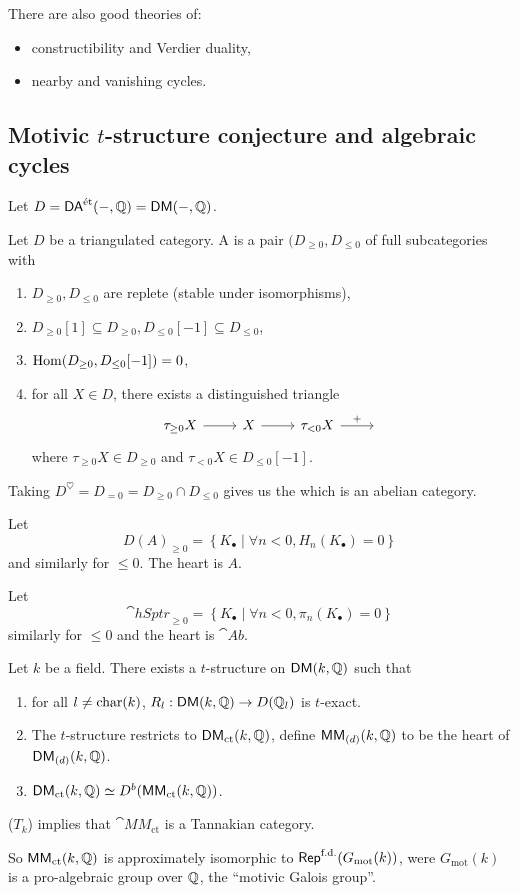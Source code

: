 There are also good theories of:
\begin{itemize}
\item constructibility and Verdier duality,
\item nearby and vanishing cycles.
\end{itemize}

\subsection{Motivic \texorpdfstring{$t$}{t}-structure conjecture and algebraic cycles}
Let $D = \mathsf{DA}^\text{\'et}(-,\mathbb Q) = \mathsf{DM}(-,\mathbb Q)$.
\begin{definition}
Let $D$ be a triangulated category. A  is a pair $(D_{\ge 0}, D_{\le
0}$ of full subcategories with
\begin{enumerate}[1)]
\item $D_{\ge 0}, D_{\le 0}$  are replete (stable under isomorphisms),
\item $D_{\ge 0}[1]\subseteq D_{\ge 0}, D_{\le 0}[-1]\subseteq D_{\le 0}$,
\item $\operatorname{Hom}(D_{\ge 0}, D_{\le 0}[-1]) = 0$,
\item for all $X\in D$, there exists a distinguished triangle
\[
\begin{tikzcd}
\tau_{\ge 0}X \ar[r] & X \ar[r] & \tau_{<0}X \ar[r,"+"] & {}
\end{tikzcd}
\]
where $\tau_{\ge 0}X\in D_{\ge 0}$ and $\tau_{<0}X\in D_{\le 0}[-1]$.
\end{enumerate}
Taking $D^\heartsuit=D_{=0} = D_{\ge 0}\cap D_{\le 0}$ gives us the  which is an
abelian category.
\end{definition}
\begin{example}
Let
\[
D(A)_{\ge 0} = \left\{ K_\bullet \middle| \forall n<0, H_n(K_\bullet)=0 \right\}
\]
and similarly for $\le 0$. The heart is $A$.
\end{example}
\begin{example}
Let
\[
\cat{hSptr}_{\ge 0} = \left\{ K_\bullet \middle| \forall n<0, \pi_n(K_\bullet)=0 \right\}
\]
similarly for $\le 0$ and the heart is $\cat{Ab}$.
\end{example}
\begin{conjecture}[$T_k$]
Let $k$ be a field. There exists a $t$-structure on $\mathsf{DM}(k,\mathbb Q)$ such that
\begin{enumerate}[1)]
\item for all $l\neq \operatorname{char}(k)$, $R_l:\cat{DM}(k,\Q)\to D(\Q_l)$ is $t$-exact.
\item The $t$-structure restricts to $\mathsf{DM}_{\text{ct}}(k,\mathbb Q)$, define
$\mathsf{MM}_{(d)}(k,\mathbb Q)$ to be the heart of $\mathsf{DM}_{(d)}(k,\mathbb Q)$.
\item $\mathsf{DM}_{\text{ct}}(k,\mathbb Q) \simeq D^{b}(\mathsf{MM}_{\text{ct}}(k,\mathbb Q))$.
\end{enumerate}
\end{conjecture}
\begin{lemma}
($T_k$) implies that $\cat{MM}_{\text{ct}}$ is a Tannakian category.
\end{lemma}
So $\mathsf{MM}_{\text{ct}}(k,\mathbb Q)$ is approximately isomorphic to $\mathsf{Rep}^{\text{f.d.}}(G_\text{mot}(k))$,
were $G_{\text{mot}}(k)$ is a pro-algebraic group over $\mathbb Q$, the ``motivic Galois group''.

